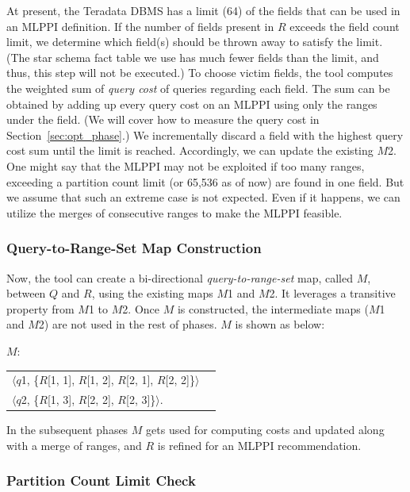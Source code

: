 \documentclass[paper]{ieice}
\begin{document}
At present, the Teradata DBMS has a limit (64) of the fields 
that can be used in an MLPPI definition.
If the number of fields present in $R$ exceeds the field count limit, 
we determine which field(s) should be thrown away to satisfy the limit. 
(The star schema fact table we use has much fewer fields than the limit, 
and thus, this step will not be executed.)
To choose victim fields, the tool computes the weighted sum of 
{\em query cost} of queries regarding each field. 
The sum can be obtained by adding up every query cost on an MLPPI using 
only the ranges under the field. 
(We will cover how to measure the query cost in Section~\ref{sec:opt_phase}.) 
We incrementally discard a field with the highest query cost sum 
until the limit is reached. 
Accordingly, we can update the existing $M$2. 
One might say that the MLPPI may not be exploited if too many ranges, 
exceeding a partition count limit (or 65,536 as of now) are found in one field. 
But we assume that such an extreme case is not expected. Even if 
it happens, we can utilize the merges of consecutive ranges to make 
the MLPPI feasible. 

\subsubsection{Query-to-Range-Set Map Construction}

Now, the tool can create a bi-directional {\em query-to-range-set} map, called $M$, 
between $Q$ and $R$, using the existing maps $M$1 and $M$2. 
It leverages a transitive property from $M$1 to $M$2.
Once $M$ is constructed, 
the intermediate maps ($M$1 and $M$2) are not used in the rest of phases. 
$M$ is shown as below:

{\it $M$}:
\begin{center}
\begin{tabular}{ll} 
$\langle${$q$1}, \{$R$[1, 1], $R$[1, 2], $R$[2, 1], $R$[2, 2]\}$\rangle$ \\
$\langle${$q$2}, \{$R$[1, 3], $R$[2, 2], $R$[2, 3]\}$\rangle$.
\end{tabular}
\end{center} 

In the subsequent phases $M$ gets used for computing costs and updated 
along with a merge of ranges, and $R$ is refined for an MLPPI recommendation. 

\subsubsection{Partition Count Limit Check}
\end{document}
